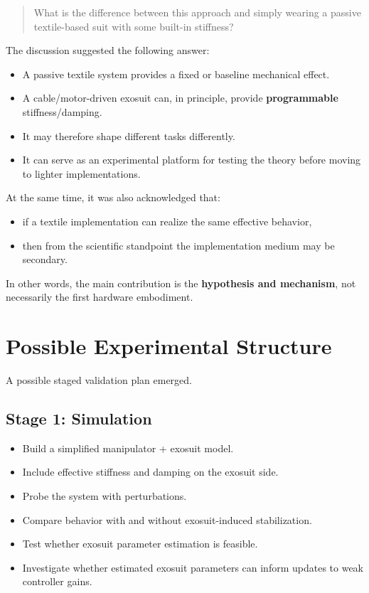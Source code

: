 \documentclass[11pt]{article}
\begin{document}
\begin{quote}
What is the difference between this approach and simply wearing a passive textile-based suit with some built-in stiffness?
\end{quote}

The discussion suggested the following answer:
\begin{itemize}[leftmargin=1.5em]
    \item A passive textile system provides a fixed or baseline mechanical effect.
    \item A cable/motor-driven exosuit can, in principle, provide \textbf{programmable} stiffness/damping.
    \item It may therefore shape different tasks differently.
    \item It can serve as an experimental platform for testing the theory before moving to lighter implementations.
\end{itemize}

At the same time, it was also acknowledged that:
\begin{itemize}[leftmargin=1.5em]
    \item if a textile implementation can realize the same effective behavior,
    \item then from the scientific standpoint the implementation medium may be secondary.
\end{itemize}

In other words, the main contribution is the \textbf{hypothesis and mechanism}, not necessarily the first hardware embodiment.

\section{Possible Experimental Structure}
A possible staged validation plan emerged.

\subsection{Stage 1: Simulation}
\begin{itemize}[leftmargin=1.5em]
    \item Build a simplified manipulator + exosuit model.
    \item Include effective stiffness and damping on the exosuit side.
    \item Probe the system with perturbations.
    \item Compare behavior with and without exosuit-induced stabilization.
    \item Test whether exosuit parameter estimation is feasible.
    \item Investigate whether estimated exosuit parameters can inform updates to weak controller gains.
\end{itemize}
\end{document}
